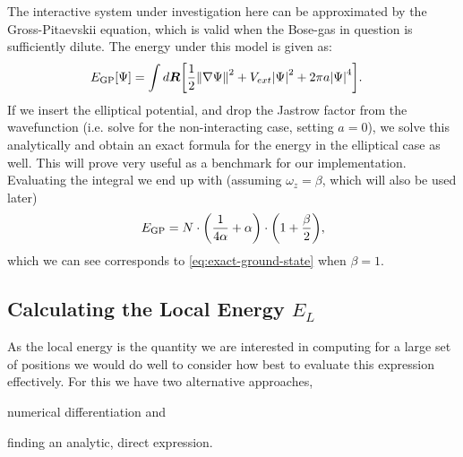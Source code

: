 \documentclass[a4paper, 11pt]{article}
\begin{document}
\begin{multicols}{2}
The interactive system under investigation here can be approximated by the
Gross-Pitaevskii equation, which is valid when the Bose-gas in question is
sufficiently dilute. The energy under this model is given
as\cite{Nilsen-phys-rev}:
\begin{align}
    \begin{split}
    &E_{\text{GP}}[\Psi]=
        \int
        d\bm{R}\bigg[\frac{1}{2}\norm{\nabla\Psi}^2+V_{ext}\abs{\Psi}^2+2\pi a\abs{\Psi}^4\bigg].
\label{eq:GP_integral}
    \end{split}
\end{align}
If we insert the elliptical potential, and drop the Jastrow factor from the
wavefunction (i.e. solve for the non-interacting case, setting $a=0$), we solve
this analytically and obtain an exact formula for the energy in the elliptical
case as  well. This will prove very useful as a benchmark for our
implementation. Evaluating the integral we end up with (assuming
$\omega_z=\beta$, which will also be used later)
\begin{align}
    E_\text{GP} = N\cdot
    \qty(\frac{1}{4\alpha}+\alpha)\cdot\qty(1+\frac{\beta}{2}),\label{eq:GP-final}
\end{align}
which we can see corresponds to \eqref{eq:exact-ground-state} when $\beta=1$.

\subsection{Calculating the Local Energy $E_L$}
As the local energy is the quantity we are interested in computing for a
large set of positions we would do well to consider how best to evaluate this
expression effectively. For this we have two alternative approaches,
\begin{inparaenum}[1)]
    \item numerical differentiation and
    \item finding an analytic, direct expression.
\end{inparaenum}


\end{multicols}
\end{document}
